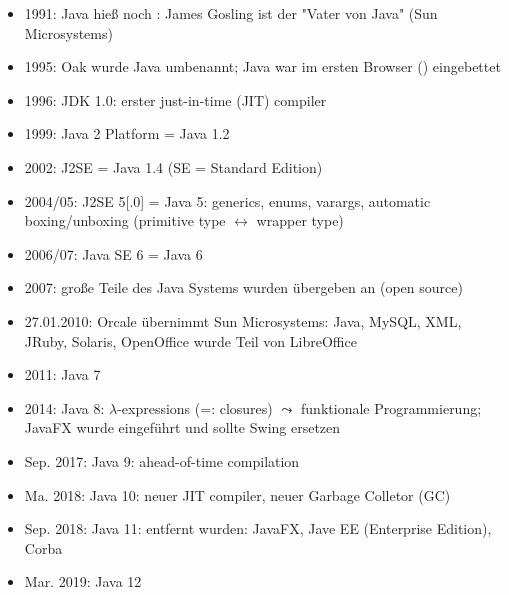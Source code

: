 \begin{itemize}
	\item 1991: Java hieß noch : James Gosling ist der "Vater von Java" (Sun Microsystems)
	\item 1995: Oak wurde Java umbenannt; Java war im ersten Browser () eingebettet
	\item 1996: JDK 1.0: erster just-in-time (JIT) compiler
	\item 1999: Java 2 Platform = Java 1.2
	\item 2002: J2SE = Java 1.4 (SE = Standard Edition)
	\item 2004/05: J2SE 5[.0]  = Java 5: generics, enums, varargs, automatic boxing/unboxing (primitive type $\leftrightarrow$ wrapper type)
	\item 2006/07: Java SE 6 = Java 6
	\item 2007: große Teile des Java Systems wurden übergeben an  (open source)
	\item 27.01.2010: Orcale übernimmt Sun Microsystems: Java, MySQL, XML, JRuby, Solaris, OpenOffice wurde Teil von LibreOffice
	\item 2011: Java 7
	\item 2014: Java 8: $\lambda$-expressions (=: closures) $\leadsto$ funktionale Programmierung; JavaFX wurde eingeführt und sollte Swing ersetzen
	\item Sep. 2017: Java 9: ahead-of-time compilation
	\item Ma. 2018: Java 10: neuer JIT compiler, neuer Garbage Colletor (GC)
	\item Sep. 2018: Java 11: entfernt wurden: JavaFX, Jave EE (Enterprise Edition), Corba
	\item Mar. 2019: Java 12
\end{itemize}

